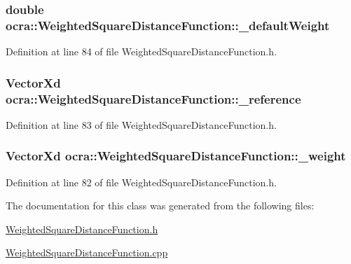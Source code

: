 \subsubsection[{\texorpdfstring{\+\_\+default\+Weight}{_defaultWeight}}]{\setlength{\rightskip}{0pt plus 5cm}double ocra\+::\+Weighted\+Square\+Distance\+Function\+::\+\_\+default\+Weight\hspace{0.3cm}{\ttfamily [protected]}}\hypertarget{classocra_1_1WeightedSquareDistanceFunction_a825041d63692b04a742c57dde4f80930}{}\label{classocra_1_1WeightedSquareDistanceFunction_a825041d63692b04a742c57dde4f80930}


Definition at line 84 of file Weighted\+Square\+Distance\+Function.\+h.

\subsubsection[{\texorpdfstring{\+\_\+reference}{_reference}}]{\setlength{\rightskip}{0pt plus 5cm}Vector\+Xd ocra\+::\+Weighted\+Square\+Distance\+Function\+::\+\_\+reference\hspace{0.3cm}{\ttfamily [protected]}}\hypertarget{classocra_1_1WeightedSquareDistanceFunction_a29e7d4c1ce99abef4f2196f11f0de9de}{}\label{classocra_1_1WeightedSquareDistanceFunction_a29e7d4c1ce99abef4f2196f11f0de9de}


Definition at line 83 of file Weighted\+Square\+Distance\+Function.\+h.

\subsubsection[{\texorpdfstring{\+\_\+weight}{_weight}}]{\setlength{\rightskip}{0pt plus 5cm}Vector\+Xd ocra\+::\+Weighted\+Square\+Distance\+Function\+::\+\_\+weight\hspace{0.3cm}{\ttfamily [protected]}}\hypertarget{classocra_1_1WeightedSquareDistanceFunction_a0363490acdf9ea0bbfc29e0721a757ed}{}\label{classocra_1_1WeightedSquareDistanceFunction_a0363490acdf9ea0bbfc29e0721a757ed}


Definition at line 82 of file Weighted\+Square\+Distance\+Function.\+h.



The documentation for this class was generated from the following files\+:\begin{DoxyCompactItemize}
\item 
\hyperlink{WeightedSquareDistanceFunction_8h}{Weighted\+Square\+Distance\+Function.\+h}\item 
\hyperlink{WeightedSquareDistanceFunction_8cpp}{Weighted\+Square\+Distance\+Function.\+cpp}\end{DoxyCompactItemize}
